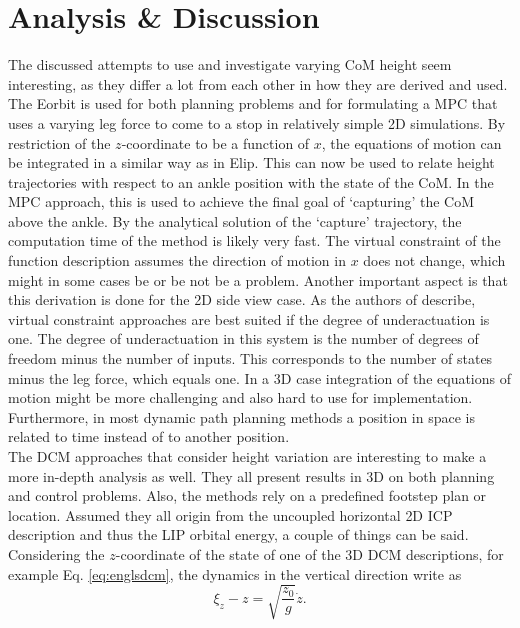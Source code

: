 \section{Analysis \& Discussion}
The discussed attempts to use and investigate varying \ac{CoM} height seem interesting, as they differ a lot from each other in how they are derived and used. The \ac{Eorbit} is used for both planning problems and for formulating a \ac{MPC} that uses a varying leg force to come to a stop in relatively simple \ac{2D} simulations. By restriction of the $z$-coordinate to be a function of $x$, the equations of motion can be integrated in a similar way as in \ac{Elip}. This can now be used to relate height trajectories with respect to an ankle position with the state of the \ac{CoM}. In the \ac{MPC} approach, this is used to achieve the final goal of `capturing' the \ac{CoM} above the ankle. By the analytical solution of the `capture' trajectory, the computation time of the method is likely very fast. The virtual constraint of the function description assumes the direction of motion in $x$ does not change, which might in some cases be or be not be a problem. Another important aspect is that this derivation is done for the \ac{2D} side view case. As the authors of \cite{koolen2016balance} describe, virtual constraint approaches are best suited if the degree of underactuation is one. The degree of underactuation in this system is the number of degrees of freedom minus the number of inputs. This corresponds to the number of states minus the leg force, which equals one. In a \ac{3D} case integration of the equations of motion might be more challenging and also hard to use for implementation. Furthermore, in most dynamic path planning methods a position in space is related to time instead of to another position.  \\
The \ac{DCM} approaches that consider height variation are interesting to make a more in-depth analysis as well. They all present results in \ac{3D} on both planning and control problems. Also, the methods rely on a predefined footstep plan or location. Assumed they all origin from the uncoupled horizontal \ac{2D} \ac{ICP} description and thus the \ac{LIP} orbital energy, a couple of things can be said. Considering the $z$-coordinate of the state of one of the \ac{3D} \ac{DCM} descriptions, for example Eq. \eqref{eq:englsdcm}, the dynamics in the vertical direction write as
\begin{equation}
\xi_z - z= \sqrt{\frac{z_0}{g}}\dot{z}.
\end{equation}
